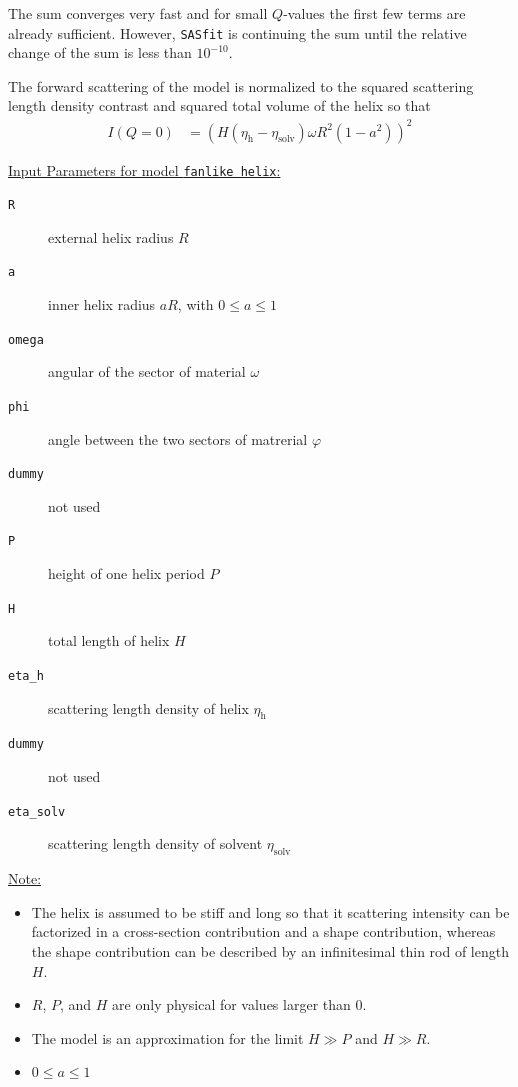 The sum converges very fast and for small $Q$-values the first few terms are already sufficient. However, {\tt SASfit} is continuing the sum until the relative change of the sum is less than $10^{-10}$.

The forward scattering of the model is normalized to the squared scattering length density contrast and squared total volume of the helix so that
\begin{align}
I(Q=0) &= \left(H\left(\eta_\text{h}-\eta_\text{solv}\right)\omega R^2\left(1-a^2\right)\right)^2
\end{align}

\vspace{5mm}

\uline{Input Parameters for model \texttt{fanlike helix}:}\\
\begin{description}
\item[\texttt{R}] external helix radius $R$
\item[\texttt{a}] inner helix radius $aR$, with $0\leq a\leq 1$
\item[\texttt{omega}] angular of the sector of material $\omega$
\item[\texttt{phi}] angle between the two sectors of matrerial $\varphi$
\item[\texttt{dummy}] not used
\item[\texttt{P}] height of one helix period $P$
\item[\texttt{H}] total length of helix $H$
\item[\texttt{eta\_h}] scattering length density of helix $\eta_\text{h}$
\item[\texttt{dummy}] not used
\item[\texttt{eta\_solv}] scattering length density of solvent $\eta_\text{solv}$
\end{description}

\noindent\uline{Note:}
\begin{itemize}
\item The helix is assumed to be stiff and long so that it scattering intensity can be factorized in a cross-section contribution and a shape contribution, whereas the shape contribution can be described by an infinitesimal thin rod of length $H$.
\item $R$, $P$, and $H$ are only physical for values larger than 0.
\item The model is an approximation for the limit $H \gg P$ and $H \gg R$.
\item $0\leq a\leq 1$
\end{itemize}

